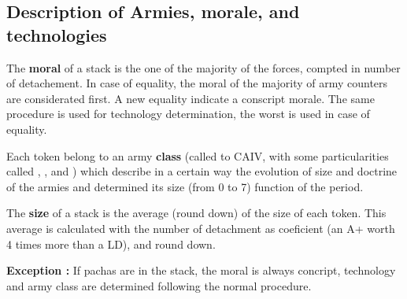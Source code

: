 \subsection{Description of Armies, morale, and technologies}

The \textbf{moral} of a stack is the one of the majority of the forces, 
compted in number of detachement. In case of equality, the moral of the 
majority of
army counters are considerated first. A new equality indicate a conscript
morale. The same procedure is used for technology determination, the   
worst is used in case of equality.

Each token belong to an army \textbf{class} (called \CAI to CAIV, with some particularities called \CAIM, \CAIIM, \CAIVM and 
\CAA) which describe in a certain way the evolution of size and doctrine of the armies and determined its size (from 0 to 
7) function of the period.

The \textbf{size} of a stack is the average (round down) of the size of each token. This average is calculated with the number of 
detachment as coeficient (an A+ worth 4 times more than a LD), and round down.

{\bf Exception :} If pachas are in the stack, the moral is always
concript, technology and army class are determined following the normal
procedure.

